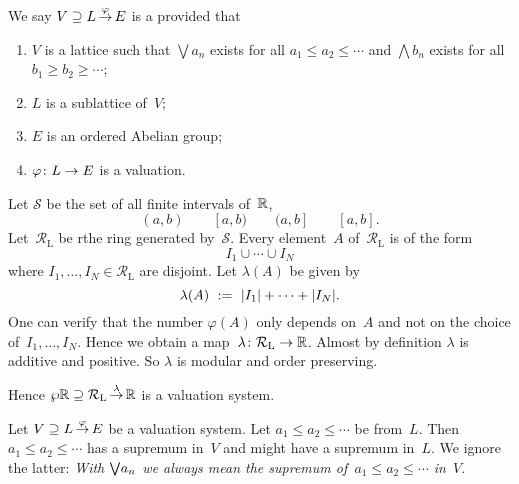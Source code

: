 \documentclass[main.tex]{subfiles}
\begin{document}
%
%
\begin{dfn}
We say $V \supseteq L\,\smash{\stackrel{\varphi}{\rightarrow}}\,E$
 is a 
provided that
\begin{enumerate}
\item
$V$ is a lattice such that
$\bigvee a_n$ exists for all $a_1 \leq a_2 \leq \dotsb$
and $\bigwedge b_n$ exists for all $b_1 \geq b_2 \geq \dotsb$;

\item
$L$ is a sublattice of~$V$;

\item
$E$ is an ordered Abelian group;

\item
$\varphi\colon L \rightarrow E$ is a valuation.
\end{enumerate}
\end{dfn}

\begin{ex}
Let $\mathcal{S}$ be the set of all finite intervals of~$\mathbb{R}$,
\begin{equation*}
(a,b)\qquad [a,b)\qquad (a,b]\qquad [a,b].
\end{equation*}
Let~$\mathcal{R}_\mathrm{L}$ be rthe ring generated by~$\mathcal{S}$.
Every element~$A$ of~$\mathcal{R}_\mathrm{L}$ is of the form
\begin{equation*}
I_1 \cup \dotsb \cup I_N
\end{equation*}
where $I_1,\dotsc,I_N\in \mathcal{R}_\mathrm{L}$
are disjoint.
Let $\lambda(A)$ be given by
\begin{equation*}
\lambda(A) \ :=\  |I_1| + \dotsb + |I_N|.
\end{equation*}
One can verify that the number $\varphi(A)$
only depends on~$A$ and not on the choice of~$I_1,\dotsc,I_N$.
Hence we obtain a map~$\lambda\colon \mathcal{R}_\mathrm{L} \rightarrow \mathbb{R}$.
Almost by definition $\lambda$ is additive and positive.
So $\lambda$ is modular and order preserving.

Hence $\wp \mathbb{R} \supseteq \mathcal{R}_\mathrm{L}\,\smash{\stackrel{\lambda}{\rightarrow}}\,\mathbb{R}$
is a valuation system.
\end{ex}

\begin{nt}
Let $V \supseteq L\,\smash{\stackrel{\varphi}{\rightarrow}}\,E$ be a valuation system.
Let $a_1 \leq a_2 \leq \dotsb$ be from~$L$.
Then $a_1 \leq a_2 \leq \dotsb$ has a supremum
in~$V$ and might have a supremum in~$L$.
We ignore the latter:
\emph{With $\textstyle{\bigvee} a_n$
we always mean the supremum of~$a_1\leq a_2\leq \dotsb $ in~$V$}.
\end{nt}
\end{document}
